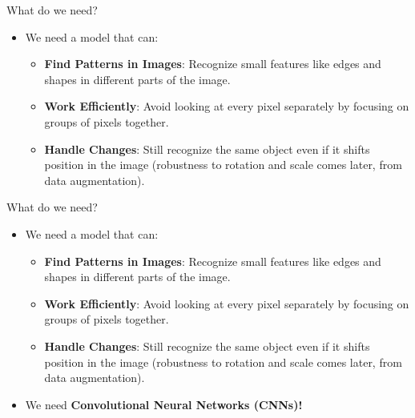 \begin{frame}{What do we need?}
\begin{itemize}
    \item We need a model that can:
    \begin{itemize}
        \item \textbf{Find Patterns in Images}: Recognize small features like edges and shapes in different parts of the image.
        \item \textbf{Work Efficiently}: Avoid looking at every pixel separately by focusing on groups of pixels together.
        \item \textbf{Handle Changes}: Still recognize the same object even if it shifts position in the image (robustness to rotation and scale comes later, from data augmentation).
    \end{itemize}
\end{itemize}
\end{frame}

\begin{frame}{What do we need?}
\begin{itemize}
    \item We need a model that can:
    \begin{itemize}
        \item \textbf{Find Patterns in Images}: Recognize small features like edges and shapes in different parts of the image.
        \item \textbf{Work Efficiently}: Avoid looking at every pixel separately by focusing on groups of pixels together.
        \item \textbf{Handle Changes}: Still recognize the same object even if it shifts position in the image (robustness to rotation and scale comes later, from data augmentation).
    \end{itemize}
    \item We need \textbf{Convolutional Neural Networks (CNNs)!}
\end{itemize}
\end{frame}

